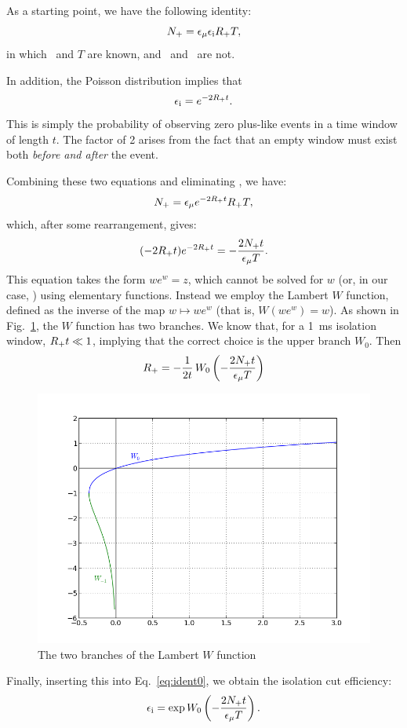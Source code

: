 \documentclass[../thesis.tex]{subfiles}
\begin{document}
As a starting point, we have the following identity:
\begin{equation}
  \label{eq:ident0}
  N_\mathrm{+} = \epsilon_\mathrm{\mu} \epsilon_\mathrm{i} R_\mathrm{+} T,
\end{equation}
in which \emu\ and $T$ are known, and \eisol\ and \Rplu\ are not.

In addition, the Poisson distribution implies that
\begin{equation}
  \label{eq:ident1}
  \epsilon_\mathrm{i} = e^{-2R_\mathrm{+} t}.
\end{equation}
This is simply the probability of observing zero plus-like events in a time window of length $t$. The factor of 2 arises from the fact that an empty window must exist both \emph{before and after} the event.

Combining these two equations and eliminating \eisol, we have:
\begin{equation}
  N_\mathrm{+} = \epsilon_\mathrm{\mu} e^{-2R_\mathrm{+} t} R_\mathrm{+} T,
\end{equation}
which, after some rearrangement, gives:
\begin{equation}
  (-2 R_\mathrm{+} t) e^{-2 R_\mathrm{+} t} = - \frac{2 N_\mathrm{+} t}{\epsilon_\mathrm{\mu} T}.
\end{equation}
This equation takes the form $we^w = z$, which cannot be solved for $w$ (or, in our case, \Rplu) using elementary functions. Instead we employ the Lambert $W$ function, defined as the inverse of the map $w \mapsto we^w$ (that is, $W(we^w) = w$). As shown in Fig.~\ref{fig:lambertW}, the $W$ function has two branches. We know that, for a 1~ms isolation window, $R_\mathrm{+} t \ll 1$, implying that the correct choice is the upper branch $W_0$. Then
\begin{equation}
  R_\mathrm{+} = -\frac{1}{2t}\, W_0 \left(-\frac{2N_\mathrm{+} t}{\epsilon_\mathrm{\mu} T}\right)
\end{equation}

\begin{figure}
  \centering
  \includegraphics[scale=0.7]{../images/lambertW.png}
  \caption{The two branches of the Lambert $W$ function}
  \label{fig:lambertW}
\end{figure}

Finally, inserting this into Eq.~\ref{eq:ident0}, we obtain the isolation cut efficiency:
\begin{equation}
  \epsilon_\mathrm{i} = \exp W_0 \left( -\frac{2N_\mathrm{+} t}{\epsilon_\mathrm{\mu} T} \right).
\end{equation}
\end{document}
